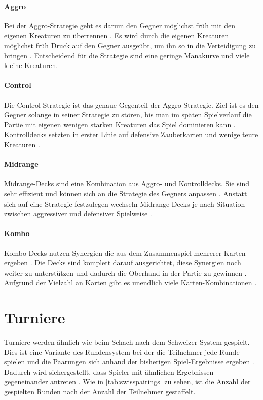\paragraph{Aggro}
Bei der Aggro-Strategie geht es darum den Gegner möglichst früh mit den eigenen Kreaturen zu überrennen \cite{wotc:gameplay}. Es wird durch die eigenen Kreaturen möglichst früh Druck auf den Gegner ausgeübt, um ihn so in die Verteidigung zu bringen \cite{wotc:gameplay}. Entscheidend für die Strategie sind eine geringe Manakurve und viele kleine Kreaturen.

\paragraph{Control}
Die Control-Strategie ist das genaue Gegenteil der Aggro-Strategie. Ziel ist es den Gegner solange in seiner Strategie zu stören, bis man im späten Spielverlauf die Partie mit eigenen wenigen starken Kreaturen das Spiel dominieren kann \cite{wotc:gameplay}. Kontrolldecks setzten in erster Linie auf defensive Zauberkarten und wenige teure Kreaturen \cite{wotc:gameplay}. 

\paragraph{Midrange}
Midrange-Decks sind eine Kombination aus Aggro- und Kontrolldecks. Sie sind sehr effizient und können sich an die Strategie des Gegners anpassen  \cite{wotc:gameplay}. Anstatt sich auf eine Strategie festzulegen wechseln Midrange-Decks je nach Situation zwischen aggressiver und defensiver Spielweise \cite{wotc:gameplay}.

\paragraph{Kombo}
Kombo-Decks nutzen Synergien die aus dem Zusammenspiel mehrerer Karten ergeben \cite{wotc:gameplay}. Die Decks sind komplett darauf ausgerichtet, diese Synergien noch weiter zu unterstützen und dadurch die Oberhand in der Partie zu gewinnen \cite{wotc:gameplay}. Aufgrund der Vielzahl an Karten gibt es unendlich viele Karten-Kombinationen \cite{wotc:gameplay}.


\section{Turniere}
Turniere werden ähnlich wie beim Schach nach dem Schweizer System gespielt. Dies ist eine Variante des Rundensystem bei der die Teilnehmer jede Runde spielen und die Paarungen sich anhand der bisherigen Spiel-Ergebnisse ergeben \cite{starcitygames:swiss}. Dadurch wird sichergestellt, dass Spieler mit ähnlichen Ergebnissen gegeneinander antreten \cite{starcitygames:swiss}. Wie in \autoref{tab:swisspairings} zu sehen, ist die Anzahl der gespielten Runden nach der Anzahl der Teilnehmer gestaffelt. 

